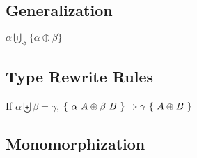 \documentclass{article}
\begin{document}
\subsection{Generalization}

$\alpha \biguplus_\sphericalangle \{\alpha \oplus \beta\}$

\subsection{Type Rewrite Rules}

If $\alpha \biguplus \beta = \gamma$, $\{~ \alpha~A \oplus \beta~B ~\} \Rightarrow \gamma~\{~ A \oplus B ~\}$


\subsection{Monomorphization}


\end{document}
